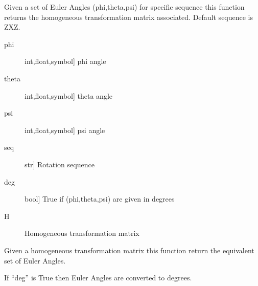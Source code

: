 \documentclass[letterpaper,10pt,english]{sphinxmanual}
\begin{document}
\begin{fulllineitems}
\label{\detokenize{_src/didactic:rkd.didactic.transformations.eul2htm}}
Given a set of Euler Angles (phi,theta,psi) for specific 
sequence this function returns the homogeneous transformation 
matrix associated. Default sequence is ZXZ.
\begin{description}
\item[{phi}] \leavevmode{[}int,float,symbol{]}
phi angle

\item[{theta}] \leavevmode{[}int,float,symbol{]}
theta angle

\item[{psi}] \leavevmode{[}int,float,symbol{]}
psi angle

\item[{seq}] \leavevmode{[}str{]}
Rotation sequence

\item[{deg}] \leavevmode{[}bool{]}
True if (phi,theta,psi) are given in degrees

\end{description}
\begin{description}
\item[{H}] \leavevmode{[}\sphinxcode{\sphinxupquote{sympy.matrices.dense.MutableDenseMatrix}}{]}
Homogeneous transformation matrix

\end{description}

\end{fulllineitems}


\begin{fulllineitems}
\label{\detokenize{_src/didactic:rkd.didactic.transformations.htm2eul}}
Given a homogeneous transformation matrix this function 
return the equivalent set of Euler Angles.

If “deg” is True then Euler Angles are converted to degrees.

\end{fulllineitems}

\end{document}
